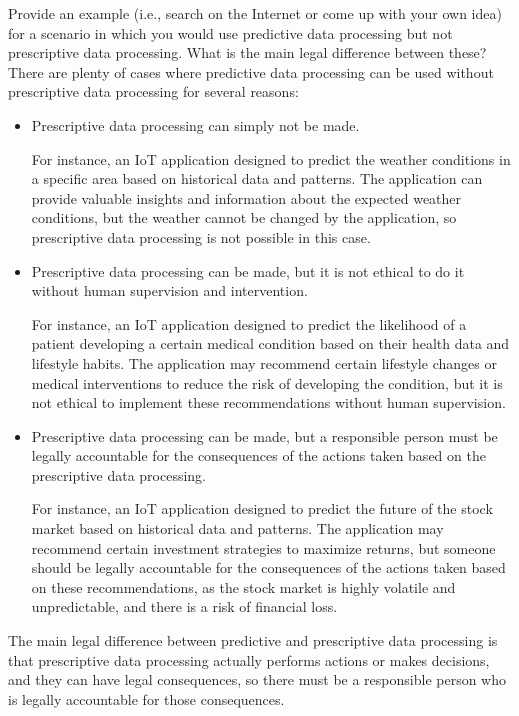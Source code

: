 \begin{ejercicio}
    Provide an example (i.e., search on the Internet or come up with your own idea) for a scenario in which you would use predictive data processing but not prescriptive data processing. What is the main legal difference between these?\\

    There are plenty of cases where predictive data processing can be used without prescriptive data processing for several reasons:
    \begin{itemize}
        \item Prescriptive data processing can simply not be made.
        
        For instance, an IoT application designed to predict the weather conditions in a specific area based on historical data and patterns. The application can provide valuable insights and information about the expected weather conditions, but the weather cannot be changed by the application, so prescriptive data processing is not possible in this case.

        \item Prescriptive data processing can be made, but it is not ethical to do it without human supervision and intervention.
        
        For instance, an IoT application designed to predict the likelihood of a patient developing a certain medical condition based on their health data and lifestyle habits. The application may recommend certain lifestyle changes or medical interventions to reduce the risk of developing the condition, but it is not ethical to implement these recommendations without human supervision.

        \item Prescriptive data processing can be made, but a responsible person must be legally accountable for the consequences of the actions taken based on the prescriptive data processing.
        
        For instance, an IoT application designed to predict the future of the stock market based on historical data and patterns. The application may recommend certain investment strategies to maximize returns, but someone should be legally accountable for the consequences of the actions taken based on these recommendations, as the stock market is highly volatile and unpredictable, and there is a risk of financial loss.
    \end{itemize}

    The main legal difference between predictive and prescriptive data processing is that prescriptive data processing actually performs actions or makes decisions, and they can have legal consequences, so there must be a responsible person who is legally accountable for those consequences.
\end{ejercicio}


